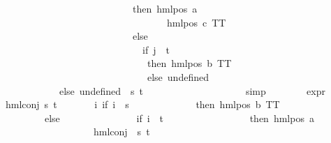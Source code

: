 \begin{isabellebody}
\ \ \ \ \ \ \ \ \ \ \ \ \ \ \ \ \ \ \ \ \ \ \ \ \ \ \ \ \ \ then\ {\isacharparenleft}{\kern0pt}hml{\isacharunderscore}{\kern0pt}pos\ a\ \isanewline
\ \ \ \ \ \ \ \ \ \ \ \ \ \ \ \ \ \ \ \ \ \ \ \ \ \ \ \ \ \ \ \ \ \ \ \ \ {\isacharparenleft}{\kern0pt}hml{\isacharunderscore}{\kern0pt}pos\ c\ TT{\isacharparenright}{\kern0pt}{\isacharparenright}{\kern0pt}\ \isanewline
\ \ \ \ \ \ \ \ \ \ \ \ \ \ \ \ \ \ \ \ \ \ \ \ \ \ \ \ \ \ else\ \isanewline
\ \ \ \ \ \ \ \ \ \ \ \ \ \ \ \ \ \ \ \ \ \ \ \ \ \ \ \ \ \ \ \ {\isacharparenleft}{\kern0pt}if\ j\ {\isacharequal}{\kern0pt}\ t\ \isanewline
\ \ \ \ \ \ \ \ \ \ \ \ \ \ \ \ \ \ \ \ \ \ \ \ \ \ \ \ \ \ \ \ \ then\ {\isacharparenleft}{\kern0pt}hml{\isacharunderscore}{\kern0pt}pos\ b\ TT{\isacharparenright}{\kern0pt}\ \isanewline
\ \ \ \ \ \ \ \ \ \ \ \ \ \ \ \ \ \ \ \ \ \ \ \ \ \ \ \ \ \ \ \ \ else\ undefined{\isacharparenright}{\kern0pt}{\isacharparenright}{\kern0pt}{\isacharparenright}{\kern0pt}{\isacharparenright}{\kern0pt}{\isacharparenright}{\kern0pt}\isanewline
\ \ \ \ \ \ \ \ \ \ \ \ \ \ \ else\ undefined{\isacharparenright}{\kern0pt}{\isacharparenright}{\kern0pt}{\isacharparenright}{\kern0pt}{\isacharparenright}{\kern0pt}\ {\isacharbackquote}{\kern0pt}\ {\isacharbraceleft}{\kern0pt}s{\isacharcomma}{\kern0pt}\ t{\isacharbraceright}{\kern0pt}{\isacharparenright}{\kern0pt}{\isacharparenright}{\kern0pt}\ {\isacharequal}{\kern0pt}\ {}{\isachardoublequoteclose}\isanewline
\ \ \ \ \ \ \ \ \isanewline
\ \ \ \ \ \ \ \ \isamarkupfalse%
\ simp\isanewline
\ \ \ \ \ \ \isamarkupfalse%
\ {\isachardoublequoteopen}expr{\isacharunderscore}{\kern0pt}{}\ \ \isanewline
\ \ \ \ {\isacharparenleft}{\kern0pt}hml{\isacharunderscore}{\kern0pt}conj\ {\isacharbraceleft}{\kern0pt}s{\isacharcomma}{\kern0pt}\ t{\isacharbraceright}{\kern0pt}\ {\isacharbraceleft}{\kern0pt}{\isacharbraceright}{\kern0pt}\isanewline
\ \ \ \ \ \ {\isacharparenleft}{\kern0pt}{\isasymlambda}i{\isachardot}{\kern0pt}\ {\isacharparenleft}{\kern0pt}if\ i\ {\isacharequal}{\kern0pt}\ s\ \isanewline
\ \ \ \ \ \ \ \ \ \ \ \ then\ {\isacharparenleft}{\kern0pt}hml{\isacharunderscore}{\kern0pt}pos\ b\ TT{\isacharparenright}{\kern0pt}\ \isanewline
\ \ \ \ \ \ \ \ \ \ \ \ else\ \isanewline
\ \ \ \ \ \ \ \ \ \ \ \ \ \ {\isacharparenleft}{\kern0pt}if\ i\ {\isacharequal}{\kern0pt}\ t\ \ \isanewline
\ \ \ \ \ \ \ \ \ \ \ \ \ \ \ then\ {\isacharparenleft}{\kern0pt}hml{\isacharunderscore}{\kern0pt}pos\ a\ \isanewline
\ \ \ \ \ \ \ \ \ \ \ \ \ \ \ \ \ \ \ \ \ \ {\isacharparenleft}{\kern0pt}hml{\isacharunderscore}{\kern0pt}conj\ {\isacharbraceleft}{\kern0pt}{\isacharbraceright}{\kern0pt}\ {\isacharbraceleft}{\kern0pt}s{\isacharcomma}{\kern0pt}\ t{\isacharbraceright}{\kern0pt}\ \isanewline

\end{isabellebody}
